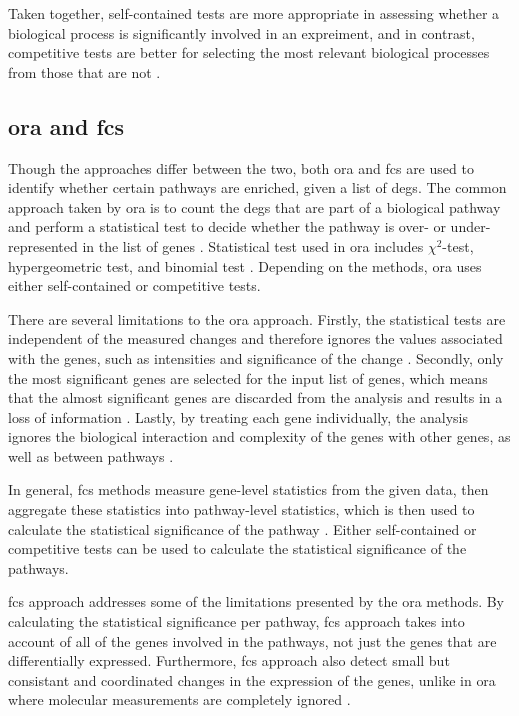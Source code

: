 Taken together, self-contained tests are more appropriate in assessing whether a biological process is significantly involved in an expreiment, and in contrast, competitive tests are better for selecting the most relevant biological processes from those that are not \citep{Wu2012}.

\subsection{\Gls{ora} and \gls{fcs}}
\label{sub:ora_and_fcs}

Though the approaches differ between the two, both \acrfull{ora} and \acrfull{fcs} are used to identify whether certain pathways are enriched, given a list of \glspl{deg}.
The common approach taken by \gls{ora} is to count the \glspl{deg} that are part of a biological pathway and perform a statistical test to decide whether the pathway is over- or under-represented in the list of genes \citep{Khatri2012}.
Statistical test used in \gls{ora} includes $\chi^2$-test, hypergeometric test, and binomial test \citep{Khatri2012}.
Depending on the methods, \gls{ora} uses either self-contained or competitive tests.

There are several limitations to the \gls{ora} approach.
Firstly, the statistical tests are independent of the measured changes and therefore ignores the values associated with the genes, such as intensities and significance of the change \citep{Khatri2012}.
Secondly, only the most significant genes are selected for the input list of genes, which means that the almost significant genes are discarded from the analysis and results in a loss of information \citep{Khatri2012}.
Lastly, by treating each gene individually, the analysis ignores the biological interaction and complexity of the genes with other genes, as well as between pathways \citep{Khatri2012}.

In general, \gls{fcs} methods measure gene-level statistics from the given data, then aggregate these statistics into pathway-level statistics, which is then used to calculate the statistical significance of the pathway \citep{Khatri2012}.
Either self-contained or competitive tests can be used to calculate the statistical significance of the pathways.

\Gls{fcs} approach addresses some of the limitations presented by the \gls{ora} methods.
By calculating the statistical significance per pathway, \gls{fcs} approach takes into account of all of the genes involved in the pathways, not just the genes that are differentially expressed.
Furthermore, \gls{fcs} approach also detect small but consistant and coordinated changes in the expression of the genes, unlike in \gls{ora} where molecular measurements are completely ignored \citep{Khatri2012}.

